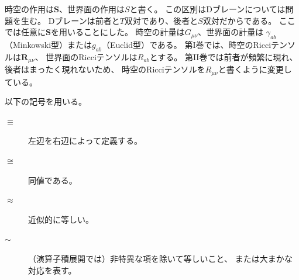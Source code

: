 時空の作用は$\boldsymbol{S}$、世界面の作用は$S$と書く。
この区別はDブレーンについては問題を生む。
Dブレーンは前者と$T$双対であり、後者と$S$双対だからである。
ここでは任意に$\boldsymbol{S}$を用いることにした。
時空の計量は$G_{\mu\nu}$、世界面の計量は
$\gamma_{ab}$（Minkowski型）または$g_{ab}$（Euclid型）である。
第I巻では、時空のRicciテンソルは$\boldsymbol{R}_{\mu\nu}$、
世界面のRicciテンソルは$R_{ab}$とする。
第II巻では前者が頻繁に現れ、後者はまったく現れないため、
時空のRicciテンソルを$R_{\mu\nu}$と書くように変更している。

以下の記号を用いる。
\begin{description}
\item[$\equiv$] 左辺を右辺によって定義する。
\item[$\cong$] 同値である。
\item[$\approx$] 近似的に等しい。
\item[$\sim$] （演算子積展開では）非特異な項を除いて等しいこと、
または大まかな対応を表す。
\end{description}
